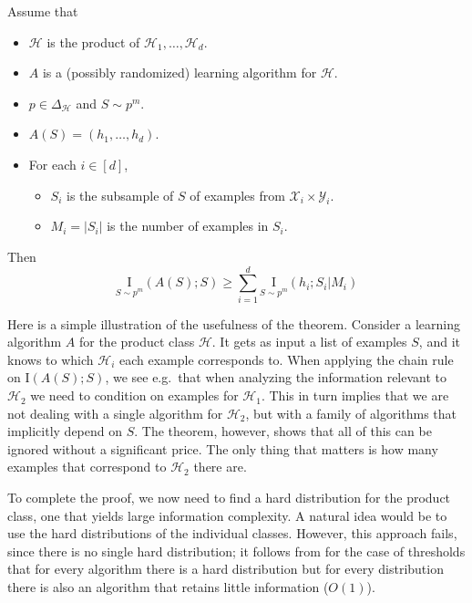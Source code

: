 \documentclass[final,12pt]{colt2018}
\newcommand{\mc}[1]{\mathcal{#1}}
\newcommand{\cH}{\mc{H}}
\newcommand{\cX}{\mc{X}}
\newcommand{\cY}{\mc{Y}}
\newcommand{\II}[1]{\mathrm{I}\left(#1\right)}
\newcommand{\I}[2]{\underset{#1}{\mathrm{I}}\left(#2\right)}
\begin{document}
\begin{theorem}\label{superadditivity}
	Assume that 
	\begin{itemize}
		\item{$\cH$ is the product of $\cH_1,\dots,\cH_d$.}
		\item{$A$ is a (possibly randomized) learning algorithm for $\cH$.}
		\item{$p\in\Delta_\cH$ and $S \sim p^m$.}
		\item{$A(S)=(h_1,\dots,h_d)$.}
		\item{For each $i \in [d]$,
			\begin{itemize}
				\item{$S_i$ is the subsample of $S$ of examples from $\cX_i\times\cY_i$.}
				\item{$M_i = |S_i|$ is the number of examples in $S_i$.}
			\end{itemize}
		} 
	\end{itemize}
	Then
	\[
	\I{S \sim p^{m}}{A(S);S} \geq \sum_{i=1}^d \I{S \sim p^{m}}{h_i;S_i|M_i}
	\]
\end{theorem}

{Here is a simple illustration of the usefulness of the theorem.
Consider a learning algorithm $A$ for the product class $\cH$.
It gets as input a list of examples $S$,
and it knows to which $\cH_i$ each example corresponds to.
When applying the chain rule on $\II{A(S);S}$,
we see e.g.\ that when analyzing the information relevant to $\cH_2$
we need to condition on examples for $\cH_1$.
This in turn implies that we are not dealing with a single algorithm for $\cH_2$,
but with a family of algorithms that implicitly depend on $S$.
The theorem, however, shows that all of this can be ignored
without a significant price.
The only thing that matters is how many examples 
that correspond to $\cH_2$ there are.
}

{To complete the proof,} we now need to find a hard distribution for the product class, one that yields large information complexity. A natural idea would be to use the hard distributions of the individual classes. However, this approach fails, since there is no single hard distribution; it follows from \cite{bassily2018learners} for the case of thresholds that for every algorithm there is a hard distribution but for every distribution there is also an algorithm that retains little information {($O(1)$)}.
\end{document}
